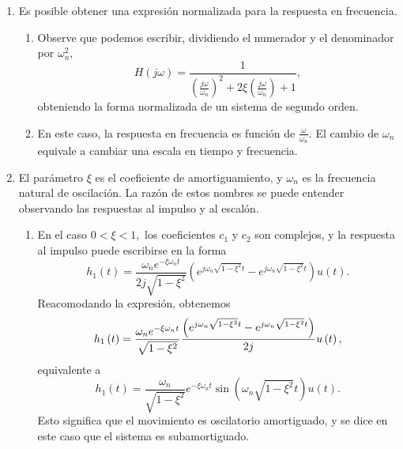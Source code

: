 \begin{enumerate}
\item  Es posible obtener una expresi\'{o}n normalizada para la respuesta en frecuencia.

\begin{enumerate}
\item  Observe que podemos escribir, dividiendo el numerador y el
denominador por $\omega _{n}^{2},$
\begin{equation}
H\left( j\omega \right) =\frac{1}{\left( \frac{j\omega }{\omega _{n}}%
\right) ^{2}+2\xi \left( \frac{j\omega }{\omega _{n}}\right) +1},
\end{equation}
obteniendo la forma normalizada de un sistema de segundo orden.

\item  En este caso, la respuesta en frecuencia es funci\'{o}n de $\frac{\omega }{\omega _{n}}$. 
El cambio de $\omega _{n}$ equivale a cambiar una escala en tiempo y frecuencia.
\end{enumerate}

\item  El par\'{a}metro $\xi $ es el coeficiente de amortiguamiento, y $\omega _{n}$ es la 
frecuencia natural de oscilaci\'{o}n. La raz\'{o}n de estos nombres se puede entender observando las 
respuestas al impulso y al escal\'{o}n. 

\begin{enumerate}
\item  En el caso $0<\xi <1,$ los coeficientes $c_{1}$ y $c_{2}$ son
complejos, y la respuesta al impulso puede escribirse en la forma
\begin{equation}
h_{1}\left( t\right) =\frac{\omega _{n}e^{-\xi \omega _{n}t}}{2j\sqrt{1-\xi
^{2}}}\left( e^{j\omega _{n}\sqrt{1-\xi ^{2}}t}-e^{j\omega _{n}\sqrt{1-\xi
^{2}}t}\right) u\left( t\right) .
\end{equation}
Reacomodando la expresi\'{o}n, obtenemos
\begin{equation}
h_{1}\left( t\right) =\frac{\omega _{n}e^{-\xi \omega _{n}t}}{\sqrt{1-\xi
^{2}}}\frac{\left( e^{j\omega _{n}\sqrt{1-\xi ^{2}}t}-e^{j\omega _{n}\sqrt{%
1-\xi ^{2}}t}\right) }{2j}u\left( t\right) ,
\end{equation}
equivalente a
\begin{equation}
h_{1}\left( t\right) =\frac{\omega _{n}}{\sqrt{1-\xi ^{2}}}e^{-\xi \omega
_{n}t}\sin \left( \omega _{n}\sqrt{1-\xi ^{2}}t\right) u\left( t\right) .
\end{equation}
Esto significa que el movimiento es oscilatorio amortiguado, y se dice en
este caso que el sistema es subamortiguado.


\end{enumerate}
\end{enumerate}
